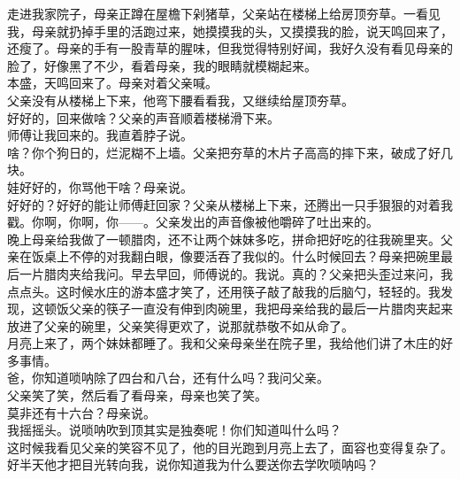走进我家院子，母亲正蹲在屋檐下剁猪草，父亲站在楼梯上给房顶夯草。一看见我，母亲就扔掉手里的活跑过来，她摸摸我的头，又摸摸我的脸，说天鸣回来了，还瘦了。母亲的手有一股青草的腥味，但我觉得特别好闻，我好久没有看见母亲的脸了，好像黑了不少，看着母亲，我的眼睛就模糊起来。
\\

本盛，天鸣回来了。母亲对着父亲喊。
\\

父亲没有从楼梯上下来，他弯下腰看看我，又继续给屋顶夯草。
\\

好好的，回来做啥？父亲的声音顺着楼梯滑下来。
\\

师傅让我回来的。我直着脖子说。
\\

啥？你个狗日的，烂泥糊不上墙。父亲把夯草的木片子高高的摔下来，破成了好几块。
\\

娃好好的，你骂他干啥？母亲说。
\\

好好的？好好的能让师傅赶回家？父亲从楼梯上下来，还腾出一只手狠狠的对着我戳。你啊，你啊，你——。父亲发出的声音像被他嚼碎了吐出来的。
\\

晚上母亲给我做了一顿腊肉，还不让两个妹妹多吃，拼命把好吃的往我碗里夹。父亲在饭桌上不停的对我翻白眼，像要活吞了我似的。什么时候回去？母亲把碗里最后一片腊肉夹给我问。早去早回，师傅说的。我说。真的？父亲把头歪过来问，我点点头。这时候水庄的游本盛才笑了，还用筷子敲了敲我的后脑勺，轻轻的。我发现，这顿饭父亲的筷子一直没有伸到肉碗里，我把母亲给我的最后一片腊肉夹起来放进了父亲的碗里，父亲笑得更欢了，说那就恭敬不如从命了。
\\

月亮上来了，两个妹妹都睡了。我和父亲母亲坐在院子里，我给他们讲了木庄的好多事情。
\\

爸，你知道唢呐除了四台和八台，还有什么吗？我问父亲。
\\

父亲笑了笑，然后看了看母亲，母亲也笑了笑。
\\

莫非还有十六台？母亲说。
\\

我摇摇头。说唢呐吹到顶其实是独奏呢！你们知道叫什么吗？
\\

这时候我看见父亲的笑容不见了，他的目光跑到月亮上去了，面容也变得复杂了。好半天他才把目光转向我，说你知道我为什么要送你去学吹唢呐吗？\\

